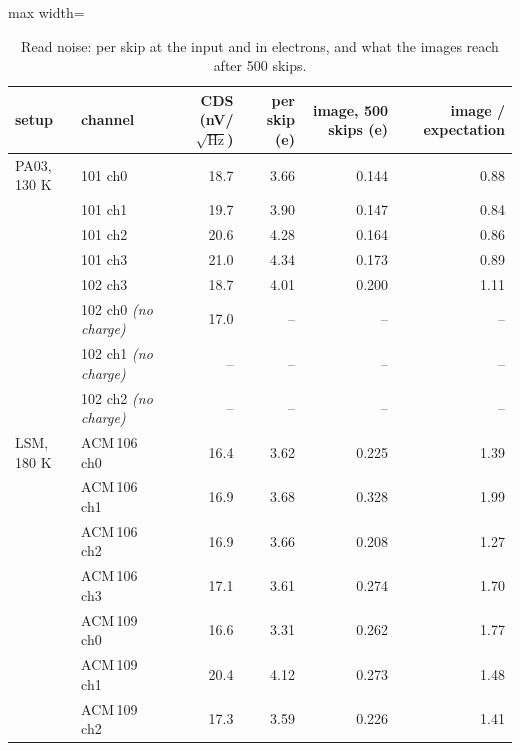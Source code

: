 \begin{table}[H]\centering\small
\caption{Read noise: per skip at the input and in electrons, and what the images reach after 500 skips.}\label{tab:noise}
\begin{adjustbox}{max width=\linewidth}
\begin{tabular}{llrrrr}\toprule
setup & channel & CDS (nV/$\sqrt{\text{Hz}}$) & per skip (e) & image, 500 skips (e) & image / expectation\\\midrule
PA03, 130 K & 101 ch0 & \cellcolor{good}18.7 & \cellcolor{good}3.66 & \cellcolor{good}0.144 & \cellcolor{good}0.88\\
 & 101 ch1 & \cellcolor{fair}19.7 & \cellcolor{good}3.90 & \cellcolor{good}0.147 & \cellcolor{good}0.84\\
 & 101 ch2 & \cellcolor{fair}20.6 & \cellcolor{fair}4.28 & \cellcolor{good}0.164 & \cellcolor{good}0.86\\
 & 101 ch3 & \cellcolor{fair}21.0 & \cellcolor{fair}4.34 & \cellcolor{good}0.173 & \cellcolor{good}0.89\\
 & 102 ch3 & \cellcolor{good}18.7 & \cellcolor{fair}4.01 & \cellcolor{good}0.200 & \cellcolor{good}1.11\\
 & 102 ch0 \textit{(no charge)} & \cellcolor{good}17.0 & -- & -- & --\\
 & 102 ch1 \textit{(no charge)} & -- & -- & -- & --\\
 & 102 ch2 \textit{(no charge)} & -- & -- & -- & --\\
\midrule
LSM, 180 K & ACM\,106 ch0 & \cellcolor{good}16.4 & \cellcolor{good}3.62 & \cellcolor{fair}0.225 & \cellcolor{fair}1.39\\
 & ACM\,106 ch1 & \cellcolor{good}16.9 & \cellcolor{good}3.68 & \cellcolor{poor}0.328 & \cellcolor{fair}1.99\\
 & ACM\,106 ch2 & \cellcolor{good}16.9 & \cellcolor{good}3.66 & \cellcolor{fair}0.208 & \cellcolor{fair}1.27\\
 & ACM\,106 ch3 & \cellcolor{good}17.1 & \cellcolor{good}3.61 & \cellcolor{fair}0.274 & \cellcolor{fair}1.70\\
 & ACM\,109 ch0 & \cellcolor{good}16.6 & \cellcolor{good}3.31 & \cellcolor{fair}0.262 & \cellcolor{fair}1.77\\
 & ACM\,109 ch1 & \cellcolor{fair}20.4 & \cellcolor{fair}4.12 & \cellcolor{fair}0.273 & \cellcolor{fair}1.48\\
 & ACM\,109 ch2 & \cellcolor{good}17.3 & \cellcolor{good}3.59 & \cellcolor{fair}0.226 & \cellcolor{fair}1.41\\

\end{tabular}
\end{adjustbox}
\end{table}
